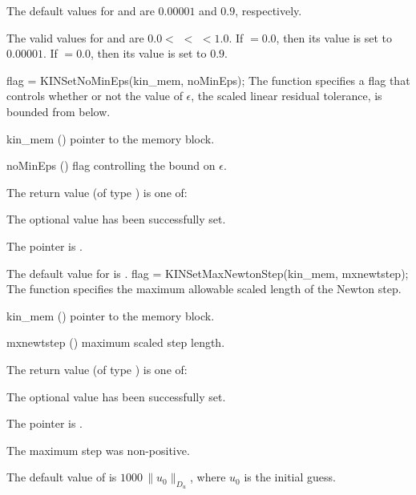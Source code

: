 {
  The default values for  and  are $0.00001$ and $0.9$, respectively.

  The valid values for  and  are
  $0.0 <$  $<$  $< 1.0$.
  If  $= 0.0$, then its value is set to $0.00001$.
  If  $= 0.0$, then its value is set to $0.9$.
}
{
flag = KINSetNoMinEps(kin\_mem, noMinEps);
}
{
  The function  specifies a flag that controls whether or not
  the value of $\epsilon$, the scaled linear residual tolerance, is
  bounded from below.
}
{
  \begin{args}[noMinEps]
  \item[kin\_mem] ()
    pointer to the {\kinsol} memory block.
  \item[noMinEps] ()
    flag controlling the bound on $\epsilon$.
  \end{args}
}
{
  The return value  (of type ) is one of:
  \begin{args}
  \item[\Id{KIN\_SUCCESS}] 
    The optional value has been successfully set.
  \item[\Id{KIN\_MEM\_NULL}]
    The  pointer is .
  \end{args}
}
{
  The default value for  is .
}
{
flag = KINSetMaxNewtonStep(kin\_mem, mxnewtstep);
}
{
  The function  specifies the maximum allowable scaled
  length of the Newton step.
}
{
  \begin{args}[mxnewtstep]
  \item[kin\_mem] ()
    pointer to the {\kinsol} memory block.
  \item[mxnewtstep] ()
    maximum scaled step length.
  \end{args}
}
{
  The return value  (of type ) is one of:
  \begin{args}
  \item[\Id{KIN\_SUCCESS}] 
    The optional value has been successfully set.
  \item[\Id{KIN\_MEM\_NULL}]
    The  pointer is .
  \item[\Id{KIN\_ILL\_INPUT}]
    The maximum step was non-positive.
  \end{args}
}
{
  The default value of  is $1000\, \| u_0 \|_{D_u}$,
  where $u_0$ is the initial guess.
}
